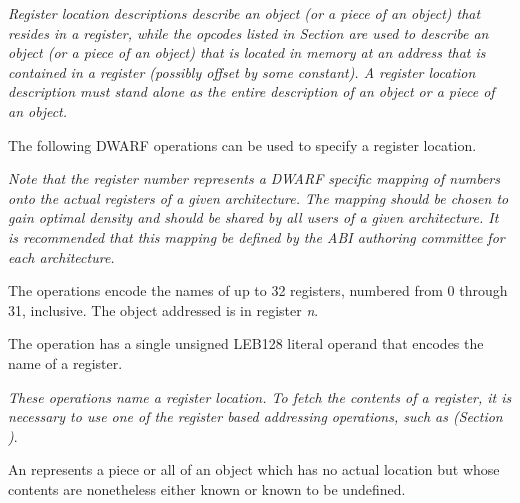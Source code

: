 \textit{Register location descriptions describe an object
(or a piece of an object) that resides in a register, while
the opcodes listed in 
Section 
are used to describe an object (or a piece of
an object) that is located in memory at an address that is
contained in a register (possibly offset by some constant). A
register location description must stand alone as the entire
description of an object or a piece of an object.
}

The following DWARF operations can be used to 
\bb
specify a register location.
\eb

\textit{Note that the register number represents a DWARF specific
mapping of numbers onto the actual registers of a given
architecture. The mapping should be chosen to gain optimal
density and should be shared by all users of a given
architecture. It is recommended that this mapping be defined
by the ABI authoring committee for each architecture.
}
\begin{enumerate}[1. ]
The \DWOPregnTARG{} operations encode the names of up to 32
registers, numbered from 0 through 31, inclusive. The object
addressed is in register \textit{n}.

\itembfnl{\DWOPregxTARG}
The \DWOPregxNAME{} operation has a single 
unsigned LEB128 literal
operand that encodes the name of a register.  

\end{enumerate}

\textit{These operations name a register location. To
fetch the contents of a register, it is necessary to use
one of the register based addressing operations, such as
\DWOPbregx{} 
(Section )}.

An 
represents a piece or all
of an object which has no actual location but whose contents
are nonetheless either known or known to be undefined.

